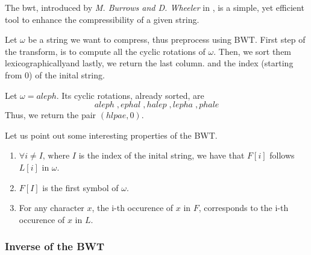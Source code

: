 \documentclass{subfiles}
\begin{document}
    The \gls{bwt}, introduced by \emph{M. Burrows \emph{and} D. Wheeler} in \cite{burrows1994},
    is a simple, yet efficient tool to enhance the compressibility of a given string.

    Let \(\omega\) be a string we want to compress, thus preprocess using BWT.
    First step of the transform, is to compute all the cyclic rotations of \(\omega\).
    Then, we sort them lexicographically\footnotemark[3] and lastly, 
    we return the last column. 
    and the index (starting from 0) of the inital string.

    \begin{example*}
        Let \(\omega = aleph\). Its cyclic rotations, already sorted, are
        \[
            aleph \;, ephal\;, halep\;, lepha\;, phale 
        \]
        Thus, we return the pair \((hlpae, 0)\).
    \end{example*}

    Let us point out some interesting properties of the BWT.
        \begin{enumerate}
            \item \(\forall i \ne I \text{, where } I\) is the index of the inital string,
                we have that \(F[i]\) follows \(L[i]\) in \(\omega\).
            \item \(F[I]\) is the first symbol of \(\omega\).
            \item For any character \(x\), the i-th occurence of \(x \text{ in } F\),
                corresponds to the i-th occurence of \(x \text{ in } L\).
        \end{enumerate}


    \subsubsection{Inverse of the BWT}
    
\end{document}
